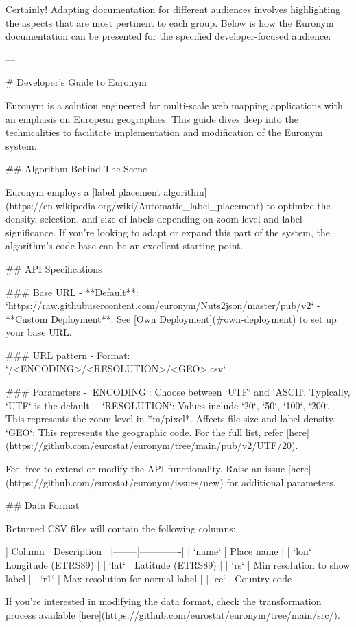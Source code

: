 Certainly! Adapting documentation for different audiences involves highlighting the aspects that are most pertinent to each group. Below is how the Euronym documentation can be presented for the specified developer-focused audience:

---

# Developer's Guide to Euronym

Euronym is a solution engineered for multi-scale web mapping applications with an emphasis on European geographies. This guide dives deep into the technicalities to facilitate implementation and modification of the Euronym system.

## Algorithm Behind The Scene

Euronym employs a [label placement algorithm](https://en.wikipedia.org/wiki/Automatic_label_placement) to optimize the density, selection, and size of labels depending on zoom level and label significance. If you're looking to adapt or expand this part of the system, the algorithm's code base can be an excellent starting point.

## API Specifications

### Base URL
- **Default**: `https://raw.githubusercontent.com/euronym/Nuts2json/master/pub/v2`
- **Custom Deployment**: See [Own Deployment](#own-deployment) to set up your base URL.

### URL pattern
- Format: `/<ENCODING>/<RESOLUTION>/<GEO>.csv`
  
### Parameters
- `ENCODING`: Choose between `UTF` and `ASCII`. Typically, `UTF` is the default.
- `RESOLUTION`: Values include `20`, `50`, `100`, `200`. This represents the zoom level in *m/pixel*. Affects file size and label density.
- `GEO`: This represents the geographic code. For the full list, refer [here](https://github.com/eurostat/euronym/tree/main/pub/v2/UTF/20).

Feel free to extend or modify the API functionality. Raise an issue [here](https://github.com/eurostat/euronym/issues/new) for additional parameters.

## Data Format

Returned CSV files will contain the following columns:

| Column | Description | 
|--------|-------------| 
| `name` | Place name | 
| `lon` | Longitude (ETRS89) | 
| `lat` | Latitude (ETRS89) | 
| `rs` | Min resolution to show label | 
| `r1` | Max resolution for normal label | 
| `cc` | Country code |

If you're interested in modifying the data format, check the transformation process available [here](https://github.com/eurostat/euronym/tree/main/src/).

